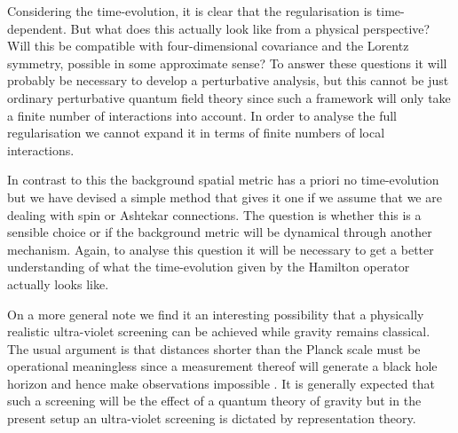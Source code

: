\documentclass[12pt]{article}
\begin{document}
Considering the time-evolution, it is clear that the regularisation is time-dependent. But what does this actually look like from a physical perspective? Will this be compatible with four-dimensional covariance and the Lorentz symmetry, possible in some approximate sense? To answer these questions it will probably be necessary to develop a perturbative analysis, but this cannot be just ordinary perturbative quantum field theory since such a framework will only take a finite number of interactions into account. In order to analyse the full regularisation we cannot expand it in terms of finite numbers of local interactions.

In contrast to this the background spatial metric has a priori no time-evolution but we have devised a simple method that gives it one if we assume that we are dealing with spin or Ashtekar connections. The question is whether this is a sensible choice or if the background metric will be dynamical through another mechanism. Again, to analyse this question it will be necessary to get a better understanding of what the time-evolution given by the Hamilton operator actually looks like. 





On a more general note we find it an interesting possibility that a physically realistic ultra-violet screening can be achieved while gravity remains classical. The usual argument is that distances shorter than the Planck scale must be operational meaningless since a measurement thereof will generate a black hole horizon and hence make observations impossible \cite{Doplicher:1994tu}. It is generally expected that such a screening will be the effect of a quantum theory of gravity but in the present setup an ultra-violet screening is dictated by representation theory.  
\end{document}
